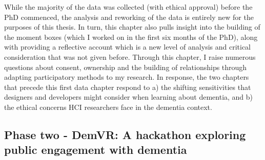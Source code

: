 While the majority of the data was collected (with ethical approval) before the PhD commenced, the analysis and reworking of the data is entirely new for the purposes of this thesis. In turn, this chapter also pulls insight into the building of the moment boxes (which I worked on in the first six months of the PhD), along with providing a reflective account which is a new level of analysis and critical consideration that was not given before. Through this chapter, I raise numerous questions about consent, ownership and the building of relationships through adapting participatory methods to my research. In response, the two chapters that precede this first data chapter respond to a) the shifting sensitivities that designers and developers might consider when learning about dementia, and b) the ethical concerns HCI researchers face in the dementia context.

\subsection{Phase two - DemVR: A hackathon exploring public engagement with dementia}


